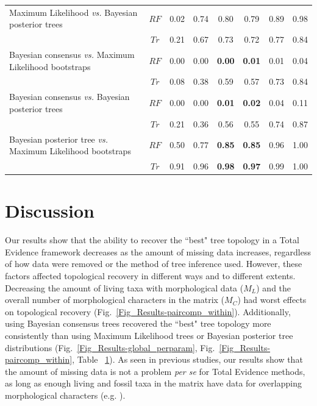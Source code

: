 \documentclass[10pt,letterpaper]{article}
\begin{document}
\begin{table}[!ht]
\begin{adjustwidth}{-2.25in}{0in}
\begin{tabular}{|l|c|c|c|c|c|c|c|}
    Maximum Likelihood \textit{vs.} Bayesian posterior trees           & $RF$ & 0.02 & 0.74 & 0.80 & 0.79 & 0.89 & 0.98 \\ 
                                                                       & $Tr$ & 0.21 & 0.67 & 0.73 & 0.72 & 0.77 & 0.84 \\ 
    Bayesian consensus \textit{vs.} Maximum Likelihood bootstraps      & $RF$ & 0.00 & 0.00 & \textbf{0.00} & \textbf{0.01} & 0.01 & 0.04 \\ 
                                                                       & $Tr$ & 0.08 & 0.38 & 0.59 & 0.57 & 0.73 & 0.84 \\ 
    Bayesian consensus \textit{vs.} Bayesian posterior trees           & $RF$ & 0.00 & 0.00 & \textbf{0.01} & \textbf{0.02} & 0.04 & 0.11 \\ 
                                                                       & $Tr$ & 0.21 & 0.36 & 0.56 & 0.55 & 0.74 & 0.87 \\ 
    Bayesian posterior tree \textit{vs.} Maximum Likelihood bootstraps & $RF$ & 0.50 & 0.77 & \textbf{0.85} & \textbf{0.85} & 0.96 & 1.00 \\ 
                                                                       & $Tr$ & 0.91 & 0.96 & \textbf{0.98} & \textbf{0.97} & 0.99 & 1.00 \\ 
   \hline
\end{tabular}
\label{Tab_Results-Difference_methods}
\end{adjustwidth}
\end{table}


\section*{Discussion}

Our results show that the ability to recover the ``best" tree topology in a Total Evidence framework decreases as the amount of missing data increases, regardless of how data were removed or the method of tree inference used. However, these factors affected topological recovery in different ways and to different extents. Decreasing the amount of living taxa with morphological data ($M_{L}$) and the overall number of morphological characters in the matrix ($M_{C}$) had worst effects on topological recovery (Fig.~\ref{Fig_Results-paircomp_within}). Additionally, using Bayesian consensus trees recovered the ``best" tree topology more consistently than using Maximum Likelihood trees or Bayesian posterior tree distributions (Fig.~\ref{Fig_Results-global_perparam}, Fig.~\ref{Fig_Results-paircomp_within}, Table ~\ref{Tab_Results-Difference_methods}). As seen in previous studies, our results show that the amount of missing data is not a problem \textit{per se} for Total Evidence methods, as long as enough living and fossil taxa in the matrix have data for overlapping morphological characters (e.g. \cite{kearneyfragmentary2002,wiensmissing2003,rouresite-specific2011,pattinsonphylogeny2014}). 
\end{document}
